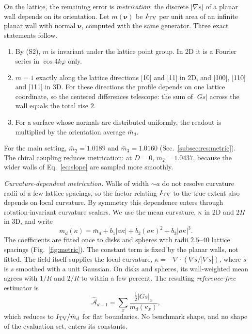 \documentclass[11pt,a4paper]{article}
\begin{document}
On the lattice, the remaining error is \emph{metrication}: the discrete $|\nabla s|$ of a planar wall depends on its orientation. Let $m(\bm\nu)$ be $I_{\rm TV}$ per unit area of an infinite planar wall with normal $\bm\nu$, computed with the same generator. Three exact statements follow.
\begin{enumerate}[label=(\alph*),leftmargin=2em,itemsep=0.1em]
\item By (S2), $m$ is invariant under the lattice point group. In 2D it is a Fourier series in $\cos4k\varphi$ only.
\item $m=1$ exactly along the lattice directions [10] and [11] in 2D, and [100], [110] and [111] in 3D. For these directions the profile depends on one lattice coordinate, so the centered differences telescope: the sum of $|Gs|$ across the wall equals the total rise $2$.
\item For a surface whose normals are distributed uniformly, the readout is multiplied by the orientation average $\bar m_d$.
\end{enumerate}
For the main setting, $\bar m_2=1.0189$ and $\bar m_3=1.0160$ (Sec.~\ref{subsec:res:metric}). The chiral coupling reduces metrication: at $D=0$, $\bar m_2=1.0437$, because the wider walls of Eq.~\eqref{eq:slope} are sampled more smoothly.

\emph{Curvature-dependent metrication.} Walls of width $\sim a$ do not resolve curvature radii of a few lattice spacings, so the factor relating $I_{\rm TV}$ to the true extent also depends on local curvature. By symmetry this dependence enters through rotation-invariant curvature scalars. We use the mean curvature, $\kappa$ in 2D and $2H$ in 3D, and write
\begin{equation}
 m_d(\kappa)=\bar m_d+b_1|a\kappa|+b_2(a\kappa)^2+b_3|a\kappa|^3 .
 \label{eq:mkappa}
\end{equation}
The coefficients are fitted once to disks and spheres with radii $2.5$--$40$ lattice spacings (Fig.~\ref{fig:metric}). The constant term is fixed by the planar walls, not fitted. The field itself supplies the local curvature, $\kappa=-\nabla\cdot(\nabla\tilde s/|\nabla\tilde s|)$, where $\tilde s$ is $s$ smoothed with a unit Gaussian. On disks and spheres, its wall-weighted mean agrees with $1/R$ and $2/R$ to within a few percent. The resulting \emph{reference-free} estimator is
\begin{equation}
 \widehat{\mathcal A}_{d-1}=\sum_x\frac{\tfrac12|Gs|_x}{m_d(\kappa_x)} ,
 \label{eq:refree}
\end{equation}
which reduces to $I_{\rm TV}/\bar m_d$ for flat boundaries. No benchmark shape, and no shape of the evaluation set, enters its constants.
\end{document}

